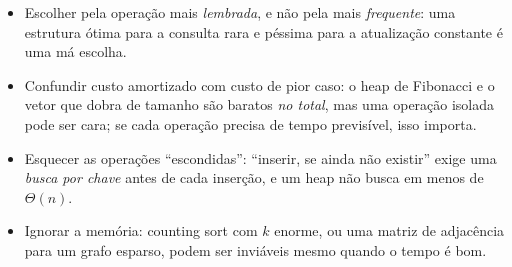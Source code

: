 \begin{cuidado}
\begin{itemize}
  \item Escolher pela operação mais \emph{lembrada}, e não pela mais \emph{frequente}: uma estrutura ótima para a consulta rara e péssima para a atualização constante é uma má escolha.
  \item Confundir custo amortizado com custo de pior caso: o heap de Fibonacci e o vetor que dobra de tamanho são baratos \emph{no total}, mas uma operação isolada pode ser cara; se cada operação precisa de tempo previsível, isso importa.
  \item Esquecer as operações ``escondidas'': ``inserir, se ainda não existir'' exige uma \emph{busca por chave} antes de cada inserção, e um heap não busca em menos de $\Theta(n)$.
  \item Ignorar a memória: counting sort com $k$ enorme, ou uma matriz de adjacência para um grafo esparso, podem ser inviáveis mesmo quando o tempo é bom.
\end{itemize}
\end{cuidado}

